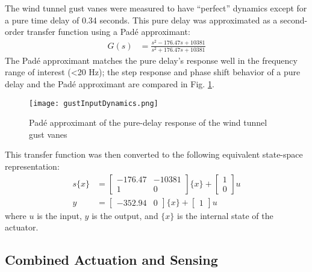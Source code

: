 The wind tunnel gust vanes were measured to have ``perfect'' dynamics except for a pure time delay of 0.34 seconds. This pure delay was approximated as a second-order transfer function using a Pad\'e approximant:
\begin{align}
    G(s) &= \frac{s^2 - 176.47s + 10381}{s^2 + 176.47s + 10381}
\end{align}
The Pad\'e approximant matches the pure delay's response well in the frequency range of interest (<20 Hz); the step response and phase shift behavior of a pure delay and the Pad\'e approximant are compared in Fig. \ref{fig:padeApprox}.
\begin{figure}[H]
    \centering
    \texttt{[image: gustInputDynamics.png]}
    \caption{Pad\'e approximant of the pure-delay response of the wind tunnel gust vanes}
    \label{fig:padeApprox}
\end{figure}
This transfer function was then converted to the following equivalent state-space representation:
\begin{equation}
\begin{aligned}
\label{eq:gustModel}
    s\{x\} &= \begin{bmatrix} -176.47 & -10381 \\ 1 & 0 \end{bmatrix} \{x\}
        + \begin{bmatrix} 1 \\ 0 \end{bmatrix} u \\
    y &= \begin{bmatrix} -352.94 & 0 \end{bmatrix} \{x\}
        + \begin{bmatrix} 1 \end{bmatrix} u
\end{aligned}
\end{equation}
where $u$ is the input, $y$ is the output, and $\{x\}$ is the internal state of the actuator.

\subsection{Combined Actuation and Sensing} %

